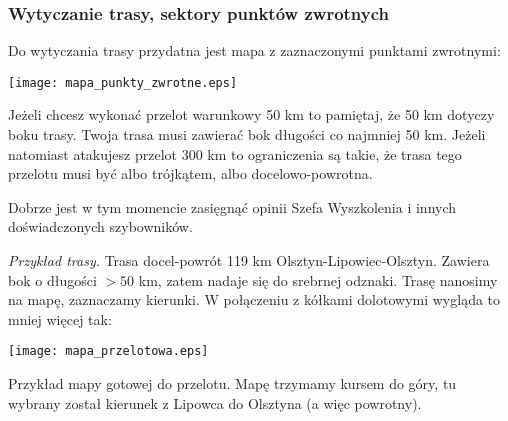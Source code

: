 \documentclass{article}
\begin{document}
\newpage

\subsubsection{Wytyczanie trasy, sektory punktów zwrotnych}
Do wytyczania trasy przydatna jest mapa z zaznaczonymi punktami zwrotnymi:
\begin{center}
\texttt{[image: mapa\_punkty\_zwrotne.eps]}
\end{center}
Jeżeli chcesz wykonać przelot warunkowy 50 km to pamiętaj, że 50 km dotyczy
boku trasy. Twoja trasa musi zawierać bok długości co najmniej 50 km.
Jeżeli natomiast atakujesz przelot 300 km to ograniczenia są takie, że
trasa tego przelotu musi być albo trójkątem, albo docelowo-powrotna.

Dobrze jest w tym momencie zasięgnąć opinii Szefa Wyszkolenia i innych
doświadczonych szybowników.

\newpage

\textit{Przykład trasy.} Trasa docel-powrót 119 km Olsztyn-Lipowiec-Olsztyn.
Zawiera bok o długości $> 50$ km, zatem nadaje się do srebrnej odznaki.
Trasę nanosimy na mapę, zaznaczamy kierunki. W połączeniu z kółkami
dolotowymi wygląda to mniej więcej tak:
\begin{center}
\texttt{[image: mapa\_przelotowa.eps]}
\end{center}

\noindent
Przykład mapy gotowej do przelotu. Mapę trzymamy kursem do góry, tu
wybrany został kierunek z Lipowca do Olsztyna (a więc powrotny).
\end{document}
